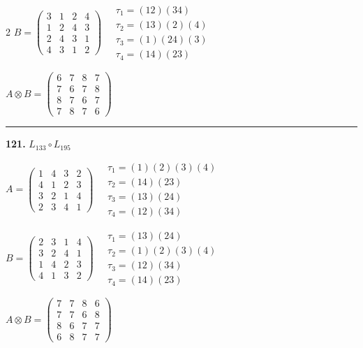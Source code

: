 \begin{multicols}{2}
$B = \begin{pmatrix} 3 & 1 & 2 & 4 \\ 1 & 2 & 4 & 3 \\ 2 & 4 & 3 & 1 \\ 4 & 3 & 1 & 2 \end{pmatrix} \quad \begin{matrix} \tau_{1}=(1 2)(3 4) \\ \tau_{2}=(1 3)(2)(4) \\ \tau_{3}=(1)(2 4)(3) \\ \tau_{4}=(1 4)(2 3) \end{matrix}$

$A \otimes B = \begin{pmatrix} 6 & 7 & 8 & 7 \\ 7 & 6 & 7 & 8 \\ 8 & 7 & 6 & 7 \\ 7 & 8 & 7 & 6 \end{pmatrix}$

\vspace{0.3em}
\hrule
\vspace{0.3em}

\noindent\textbf{121.} $L_{133} \circ L_{195}$

$A = \begin{pmatrix} 1 & 4 & 3 & 2 \\ 4 & 1 & 2 & 3 \\ 3 & 2 & 1 & 4 \\ 2 & 3 & 4 & 1 \end{pmatrix} \quad \begin{matrix} \tau_{1}=(1)(2)(3)(4) \\ \tau_{2}=(1 4)(2 3) \\ \tau_{3}=(1 3)(2 4) \\ \tau_{4}=(1 2)(3 4) \end{matrix}$

$B = \begin{pmatrix} 2 & 3 & 1 & 4 \\ 3 & 2 & 4 & 1 \\ 1 & 4 & 2 & 3 \\ 4 & 1 & 3 & 2 \end{pmatrix} \quad \begin{matrix} \tau_{1}=(1 3)(2 4) \\ \tau_{2}=(1)(2)(3)(4) \\ \tau_{3}=(1 2)(3 4) \\ \tau_{4}=(1 4)(2 3) \end{matrix}$

$A \otimes B = \begin{pmatrix} 7 & 7 & 8 & 6 \\ 7 & 7 & 6 & 8 \\ 8 & 6 & 7 & 7 \\ 6 & 8 & 7 & 7 \end{pmatrix}$


\end{multicols}
